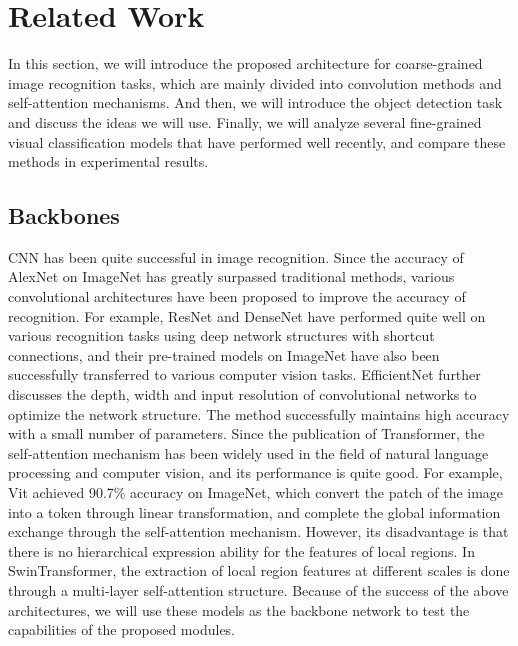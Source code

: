 \documentclass[conference]{IEEEtran}
\begin{document}
\section{Related Work}
In this section, we will introduce the proposed architecture for coarse-grained image recognition tasks, which are mainly divided into convolution methods and self-attention mechanisms. And then, we will introduce the object detection task and discuss the ideas we will use. Finally, we will analyze several fine-grained visual classification models that have performed well recently, and compare these methods in experimental results.

\subsection{Backbones}
CNN has been quite successful in image recognition. Since the accuracy of AlexNet\cite{AlexNet} on ImageNet\cite{ImageNet} has greatly surpassed traditional methods, various convolutional architectures have been proposed to improve the accuracy of recognition. For example, ResNet\cite{ResNet} and DenseNet\cite{DenseNet} have performed quite well on various recognition tasks using deep network structures with shortcut connections, and their pre-trained models on ImageNet have also been successfully transferred to various computer vision tasks. EfficientNet\cite{EfficientNet} further discusses the depth, width and input resolution of convolutional networks to optimize the network structure. The method successfully maintains high accuracy with a small number of parameters.
Since the publication of Transformer\cite{Transformer}, the self-attention mechanism has been widely used in the field of natural language processing and computer vision, and its performance is quite good. For example, Vit\cite{ViT} achieved 90.7\% accuracy on ImageNet, which convert the patch of the image into a token through linear transformation, and complete the global information exchange through the self-attention mechanism. However, its disadvantage is that there is no hierarchical expression ability for the features of local regions. In SwinTransformer\cite{Swin_T}, the extraction of local region features at different scales is done through a multi-layer self-attention structure. Because of the success of the above architectures, we will use these models as the backbone network to test the capabilities of the proposed modules.
\end{document}
